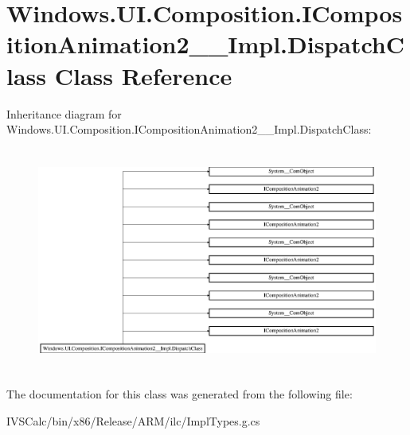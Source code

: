 \hypertarget{class_windows_1_1_u_i_1_1_composition_1_1_i_composition_animation2_____impl_1_1_dispatch_class}{}\section{Windows.\+U\+I.\+Composition.\+I\+Composition\+Animation2\+\_\+\+\_\+\+Impl.\+Dispatch\+Class Class Reference}
\label{class_windows_1_1_u_i_1_1_composition_1_1_i_composition_animation2_____impl_1_1_dispatch_class}
Inheritance diagram for Windows.\+U\+I.\+Composition.\+I\+Composition\+Animation2\+\_\+\+\_\+\+Impl.\+Dispatch\+Class\+:\begin{figure}[H]
\begin{center}
\leavevmode
\includegraphics[height=7.439613cm]{class_windows_1_1_u_i_1_1_composition_1_1_i_composition_animation2_____impl_1_1_dispatch_class}
\end{center}
\end{figure}


The documentation for this class was generated from the following file\+:\begin{DoxyCompactItemize}
\item 
I\+V\+S\+Calc/bin/x86/\+Release/\+A\+R\+M/ilc/Impl\+Types.\+g.\+cs\end{DoxyCompactItemize}
